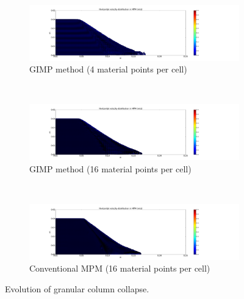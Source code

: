 \begin{figure}
\ContinuedFloat
	\centering
	\begin{subfigure}[b]{\textwidth}
		\centering
		\includegraphics[width=\textwidth]{4GIMPM_6tc}
		\caption{GIMP method (4 material points per cell)}
		\label{fig:4GIMPM_6tc}
	\end{subfigure} \\
	\begin{subfigure}[b]{\textwidth}
		\centering
		\includegraphics[width=\textwidth]{16GIMPM_6tc}
		\caption{GIMP method (16 material points per cell)}
		\label{fig:16GIMPM_6tc}
	\end{subfigure} \\
	\begin{subfigure}[b]{\textwidth}
		\centering
		\includegraphics[width=\textwidth]{16MPM_6tc}
		\caption{Conventional MPM (16 material points per cell)}
		\label{fig:16MPM_6tc}
	\end{subfigure}
	\caption*{$t = 6\tau_c$}
	\caption{Evolution of granular column collapse.}
	\label{fig:MPM_GIMP_TC}
\end{figure} 

